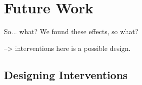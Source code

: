 \chapter{Future Work}
So... what?
We found these effects, so what?

--> interventions
here is a possible design.
\section{Designing Interventions}